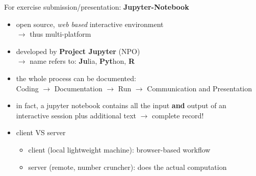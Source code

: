 %
%
\begin{frame}[c]
	For exercise submission/presentation: 
\Vspace{0.5cm}
 \textbf{Jupyter-Notebook} 
\hspace*{0.5cm}
\begin{itemize}
	\item
	open source, \emph{web based} interactive environment\\
	$\rightarrow$ thus multi-platform
	\item
	developed by   \textbf{Project Jupyter} (NPO)
	~\\
	$\rightarrow$ name refers to: \textbf{Ju}lia, \textbf{Pyt}hon, \textbf{R}
\end{itemize}

\begin{itemize}
	\item
	the whole process can be documented:\\
	Coding $\rightarrow$ Documentation $\rightarrow$ Run
	$\rightarrow$ Communication and Presentation
\end{itemize}

\begin{itemize}
	\item
	in fact, a jupyter notebook contains all the input \textbf{and} output
	of an interactive session plus additional text
	$\rightarrow$ complete record!
\end{itemize}

\begin{itemize}
	\item client VS server
	\begin{itemize}
		\item client (local lightweight machine): browser-based workflow
		\item server (remote, number cruncher): does the actual computation
	\end{itemize}
\end{itemize}
\end{frame}

